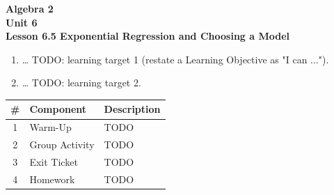 \documentclass[10pt]{article}
\begin{document}
\vspace{-0.8in}

\begin{center}
  {\color{white}\textbf{\LARGE Algebra 2}}\\[4pt]
  {\color{forestmid}\large\textbf{Unit 6}}\\[6pt]
  {\color{white}\textbf{\large Lesson 6.5 \quad Exponential Regression and Choosing a Model}}
\end{center}

\vspace{0.22in}
\namedateperiod
\vspace{0.18in}

\begin{learningtargetbox}
\small
\begin{enumerate}[leftmargin=1.5em, itemsep=5pt]
  \item \ldots{} TODO: learning target 1 (restate a Learning Objective as "I can ...").
  \item \ldots{} TODO: learning target 2.
\end{enumerate}
\end{learningtargetbox}

\vspace{0.14in}

\begin{tocbox}
\small
\renewcommand{\arraystretch}{1.5}
\begin{tabularx}{\linewidth}{@{} c l X @{}}
\rowcolor{forestbg}
\textbf{\#} & \textbf{Component} & \textbf{Description} \\
\midrule
1 & Warm-Up      & TODO \\
2 & Group Activity & TODO \\
3 & Exit Ticket  & TODO \\
4 & Homework     & TODO \\
\end{tabularx}
\end{tocbox}
\end{document}
